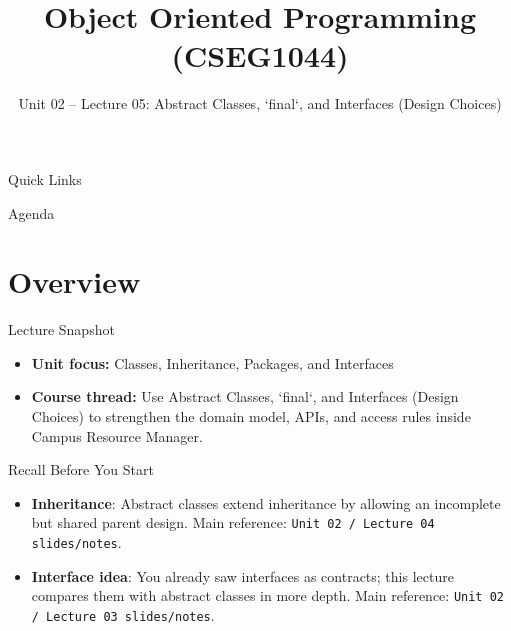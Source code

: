 \documentclass{beamer}
\title[OOPS with Java]{Object Oriented Programming (CSEG1044)}
\subtitle{Unit 02 -- Lecture 05: Abstract Classes, `final`, and Interfaces (Design Choices)}
\begin{document}
\begin{frame}[fragile]
  \titlepage
  \vspace{0.5em}
  \slidesources{\OOPSUnitIISources}
\end{frame}

\begin{frame}{Quick Links}
  \centering
  \hyperlink{sec:overview}{}\hspace{0.6em}
  \hyperlink{sec:concepts}{}\hspace{0.6em}
  \hyperlink{sec:demo}{}\hspace{0.6em}
  \hyperlink{sec:summary}{}
  \slidesources{\OOPSUnitIISources}
\end{frame}

\begin{frame}{Agenda}
  \tableofcontents
  \slidesources{\OOPSUnitIISources}
\end{frame}

\section{Overview}
\label{sec:overview}

\begin{frame}{Lecture Snapshot}
\begin{itemize}[<+->]
  \item \textbf{Unit focus:} Classes, Inheritance, Packages, and Interfaces
  \item \textbf{Course thread:} Use Abstract Classes, `final`, and Interfaces (Design Choices) to strengthen the domain model, APIs, and access rules inside Campus Resource Manager.
\end{itemize}
  \slidesources{\OOPSUnitIISources}
\end{frame}

\begin{frame}{Recall Before You Start}
\begin{itemize}[<+->]
  \item \textbf{Inheritance}: Abstract classes extend inheritance by allowing an incomplete but shared parent design. Main reference: \texttt{Unit 02 / Lecture 04 slides/notes}.
  \item \textbf{Interface idea}: You already saw interfaces as contracts; this lecture compares them with abstract classes in more depth. Main reference: \texttt{Unit 02 / Lecture 03 slides/notes}.
\end{itemize}
  \slidesources{\OOPSUnitIISources}
\end{frame}
\end{document}
